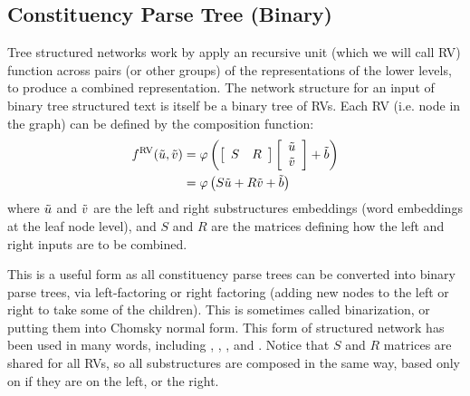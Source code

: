 \documentclass[12pt,parskip]{komatufte}
\begin{document}

\subsection{Constituency Parse Tree (Binary)}
Tree structured networks work by apply an recursive unit (which we will call RV) function across pairs (or other groups) of the representations of the lower levels, to produce a combined representation.
The network structure for an input of binary tree structured text is itself be a binary tree of RVs.
Each RV (i.e. node in the graph) can be defined by the composition function:
\begin{align}
	\d f_{RV}(\v u, \v v) &= \varphi\left(\left[\begin{array}{cc}
	S & R\end{array}\right]\left[\begin{array}{c}
	\v u\\
	\v v
	\end{array}\right] + \v b \right) \\ \label{equ:rnn1}
			     &= \varphi\left( S\v u +R\v v + \v b \right)
\end{align}
where $\tilde{u}$ and $\tilde{v}$ are the left and right substructures embeddings (word embeddings at the leaf node level), and $S$ and $R$ are the matrices defining how the left and right inputs are to be combined.


This is a useful form as all constituency parse trees can be converted into binary parse trees, via left-factoring or right factoring (adding new nodes to the left or right to take some of the children).
This is sometimes called binarization, or putting them into  Chomsky normal form.
This form of structured network has been used in many words, including , \textcite{SocherEtAl2011:RAE},  \textcite{SocherEtAl2011:PoolRAE},
 \textcite{Socher2011ParsingPhrases} and \textcite{zhang2014BRAE}.
Notice that $S$ and $R$ matrices are shared for all RVs, so all substructures are composed in the same way, based only on if they are on the left, or the right.
\end{document}
